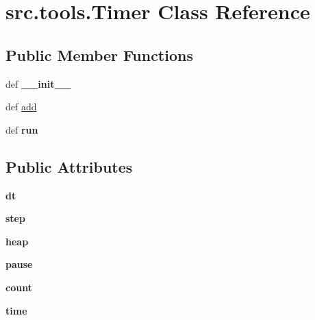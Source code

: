 \hypertarget{classsrc_1_1tools_1_1_timer}{\section{src.\-tools.\-Timer \-Class \-Reference}
\label{classsrc_1_1tools_1_1_timer}
}
\subsection*{\-Public \-Member \-Functions}
\begin{DoxyCompactItemize}
\item 
\hypertarget{classsrc_1_1tools_1_1_timer_a64a96f327bdc30a371a0c84986480c1a}{def {\bfseries \-\_\-\-\_\-init\-\_\-\-\_\-}}\label{classsrc_1_1tools_1_1_timer_a64a96f327bdc30a371a0c84986480c1a}

\item 
def \hyperlink{classsrc_1_1tools_1_1_timer_ac8258edd10aae7b010c9cedba704e82e}{add}
\item 
\hypertarget{classsrc_1_1tools_1_1_timer_a95b269603966c7682eceb107caf54e28}{def {\bfseries run}}\label{classsrc_1_1tools_1_1_timer_a95b269603966c7682eceb107caf54e28}

\end{DoxyCompactItemize}
\subsection*{\-Public \-Attributes}
\begin{DoxyCompactItemize}
\item 
\hypertarget{classsrc_1_1tools_1_1_timer_a08cd03adf3bbeb83d8119e64e431acbc}{{\bfseries dt}}\label{classsrc_1_1tools_1_1_timer_a08cd03adf3bbeb83d8119e64e431acbc}

\item 
\hypertarget{classsrc_1_1tools_1_1_timer_af66aedbc318bd42c148d23eff6b8eed7}{{\bfseries step}}\label{classsrc_1_1tools_1_1_timer_af66aedbc318bd42c148d23eff6b8eed7}

\item 
\hypertarget{classsrc_1_1tools_1_1_timer_ac0987285bf92f37100db13ec4768d305}{{\bfseries heap}}\label{classsrc_1_1tools_1_1_timer_ac0987285bf92f37100db13ec4768d305}

\item 
\hypertarget{classsrc_1_1tools_1_1_timer_a25e65ae4b8f276a4e2effcfb4c8253d5}{{\bfseries pause}}\label{classsrc_1_1tools_1_1_timer_a25e65ae4b8f276a4e2effcfb4c8253d5}

\item 
\hypertarget{classsrc_1_1tools_1_1_timer_a84d7a3dad718289a753f2187bb979622}{{\bfseries count}}\label{classsrc_1_1tools_1_1_timer_a84d7a3dad718289a753f2187bb979622}

\item 
\hypertarget{classsrc_1_1tools_1_1_timer_a00124ab1bde94c77d2e063d8d821309c}{{\bfseries time}}\label{classsrc_1_1tools_1_1_timer_a00124ab1bde94c77d2e063d8d821309c}

\end{DoxyCompactItemize}


